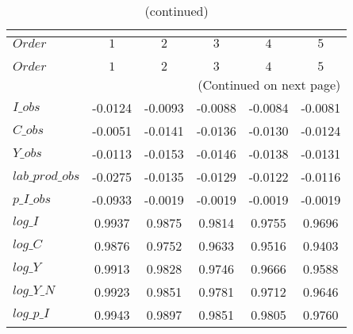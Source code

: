  
\begin{center}
\begin{longtable}{lccccc} 
\caption{COEFFICIENTS OF AUTOCORRELATION}\\
 \label{Table:th_autocorr_matrix}\\
\toprule 
$Order           $	 & 	 $          1$	 & 	 $          2$	 & 	 $          3$	 & 	 $          4$	 & 	 $          5$\\
\midrule \endfirsthead 
\caption{(continued)}\\
 \toprule \\ 
$Order           $	 & 	 $          1$	 & 	 $          2$	 & 	 $          3$	 & 	 $          4$	 & 	 $          5$\\
\midrule \endhead 
\midrule \multicolumn{6}{r}{(Continued on next page)} \\ \bottomrule \endfoot 
\bottomrule \endlastfoot 
$I\_obs          $	 & 	    -0.0124	 & 	    -0.0093	 & 	    -0.0088	 & 	    -0.0084	 & 	    -0.0081 \\ 
$C\_obs          $	 & 	    -0.0051	 & 	    -0.0141	 & 	    -0.0136	 & 	    -0.0130	 & 	    -0.0124 \\ 
$Y\_obs          $	 & 	    -0.0113	 & 	    -0.0153	 & 	    -0.0146	 & 	    -0.0138	 & 	    -0.0131 \\ 
$lab\_prod\_obs  $	 & 	    -0.0275	 & 	    -0.0135	 & 	    -0.0129	 & 	    -0.0122	 & 	    -0.0116 \\ 
$p\_I\_obs       $	 & 	    -0.0933	 & 	    -0.0019	 & 	    -0.0019	 & 	    -0.0019	 & 	    -0.0019 \\ 
$log\_I          $	 & 	     0.9937	 & 	     0.9875	 & 	     0.9814	 & 	     0.9755	 & 	     0.9696 \\ 
$log\_C          $	 & 	     0.9876	 & 	     0.9752	 & 	     0.9633	 & 	     0.9516	 & 	     0.9403 \\ 
$log\_Y          $	 & 	     0.9913	 & 	     0.9828	 & 	     0.9746	 & 	     0.9666	 & 	     0.9588 \\ 
$log\_Y\_N       $	 & 	     0.9923	 & 	     0.9851	 & 	     0.9781	 & 	     0.9712	 & 	     0.9646 \\ 
$log\_p\_I       $	 & 	     0.9943	 & 	     0.9897	 & 	     0.9851	 & 	     0.9805	 & 	     0.9760 \\ 
\end{longtable}
 \end{center}
